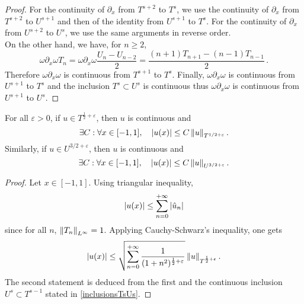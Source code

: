 \documentclass[a4paper]{article}
\begin{document}
\begin{proof}
	For the continuity of $\partial_x$ from $T^{s+2}$ to $T^s$, we use the continuity of $\partial_x$ from $T^{s+2}$ to $U^{s+1}$ and then of the identity from $U^{s+1}$ to $T^s$. For the continuity of $\partial_x$ from $U^{s+2}$ to $U^s$, we use the same arguments in reverse order. \\
	On the other hand, we have, for $n \geq 2$,
	\[\omega \partial_x \omega T_n = \omega\partial_x \omega \frac{U_n - U_{n-2}}{2} = \frac{(n+1)T_{n+1} - (n-1)T_{n-1}}{2}\,.\]
	Therefore $\omega \partial_x \omega$ is continuous from $T^{s+1}$ to $T^s$. Finally, $\omega \partial_x \omega$ is continuous from $U^{s+1}$ to $T^s$ and the inclusion $T^s \subset U^s$ is continuous thus $\omega \partial_x \omega$ is continuous from $U^{s+1}$ to $U^s$.  
\end{proof}
\begin{Lem}
	\label{LemInjectionsContinues}
	For all $\varepsilon >0$, if $u \in T^{\frac{1}{2} + \varepsilon}$, then $u$ is continuous and
	\[ \exists C : \forall x \in [-1,1], \quad \left\lvert u(x) \right\rvert \leq C \left\|u\right\|_{T^{1/2 + \varepsilon}}.\]	
	Similarly, if $u \in U^{3/2 + \varepsilon}$, then $u$ is continuous and 
	\[ \exists C : \forall x \in [-1,1], \quad \left\lvert u(x) \right\rvert \leq C \left\|u\right\|_{U^{3/2 + \varepsilon}}.\]
\end{Lem}
\begin{proof}
	Let $x \in [-1,1]$. Using triangular inequality,
	\[\left\lvert u(x) \right\rvert \leq \sum_{n = 0}^{+ \infty} \left\lvert \hat{u}_n \right\rvert\]
	since for all $n$, $\left\|T_n\right\|_{L^\infty} = 1$. Applying Cauchy-Schwarz's inequality, one gets
	\[\left\lvert u(x) \right\rvert \leq \sqrt{\sum_{n= 0}^{+ \infty} \frac{1}{(1+ n^2)^{\frac{1}{2}+ \varepsilon}}} \left\|u\right\|_{T^{\frac{1}{2} + \varepsilon}}.\]
	The second statement is deduced from the first and the continuous inclusion $U^{s} \subset T^{s-1}$ stated in \autoref{inclusionsTsUs}. 
\end{proof}	
\end{document}
